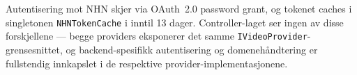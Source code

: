 
Autentisering mot NHN skjer via OAuth~2.0 password grant, og tokenet caches i singletonen \texttt{NHNTokenCache} i inntil 13 dager. Controller-laget ser ingen av disse forskjellene — begge providers eksponerer det samme \texttt{IVideoProvider}-grensesnittet, og backend-spesifikk autentisering og domenehåndtering er fullstendig innkapslet i de respektive provider-implementasjonene.